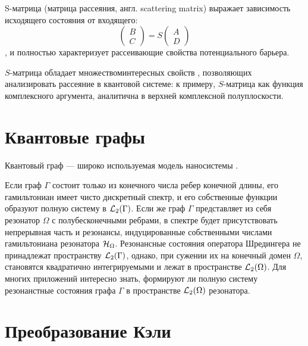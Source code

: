 S-матрица (матрица рассеяния, англ. scattering matrix) выражает зависимость исходящего состояния от входящего:
\[
\begin{pmatrix} B \\ C \end{pmatrix} = S \begin{pmatrix} A \\ D \end{pmatrix}
\]
, и полностью характеризует рассеивающие свойства потенциального барьера.

$S$-матрица обладает множествоминтересных свойств \cite[стр. 75]{perelomov1998quantum}, позволяющих анализировать рассеяние в квантовой системе: к примеру, $S$-матрица как функция комплексного аргумента, аналитична в верхней комплексной полуплоскости. 



\section{Квантовые графы}
Квантовый граф — широко используемая модель наносистемы \cite{kuchment2002graph, lobanov2013genetic, brown2010analysis}. 

Если граф $\Gamma$ состоит только из конечного числа ребер конечной длины, его гамильтониан имеет чисто дискретный спектр, и его собственные функции образуют полную систему в $\mathcal{L}_2(\Gamma)$. Если же граф $\Gamma$ представляет из себя резонатор $\Omega$ с полубесконечными ребрами, в спектре будет присутствовать непрерывная часть и резонансы, индуцированные собственными числами гамильтониана резонатора $\mathcal{H}_\Omega$. Резонансные состояния оператора Шредингера не принадлежат пространству $\mathcal{L}_2(\Gamma)$, однако, при сужении их на конечный домен $\Omega$, становятся квадратично интегрируемыми и лежат в пространстве $\mathcal{L}_2(\Omega)$. Для многих приложений интересно знать, формируют ли полную систему резонанстные состояния графа $\Gamma$ в пространстве $\mathcal{L}_2(\Omega)$ резонатора.

\section{Преобразование Кэли}

